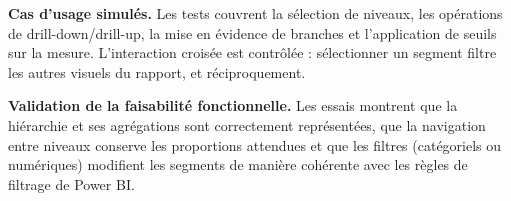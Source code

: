 \textbf{Cas d’usage simulés.} Les tests couvrent la sélection de niveaux, les opérations de drill-down/drill-up, la mise en évidence de branches et l’application de seuils sur la mesure. L’interaction croisée est contrôlée : sélectionner un segment filtre les autres visuels du rapport, et réciproquement.

\textbf{Validation de la faisabilité fonctionnelle.} Les essais montrent que la hiérarchie et ses agrégations sont correctement représentées, que la navigation entre niveaux conserve les proportions attendues et que les filtres (catégoriels ou numériques) modifient les segments de manière cohérente avec les règles de filtrage de Power BI.


